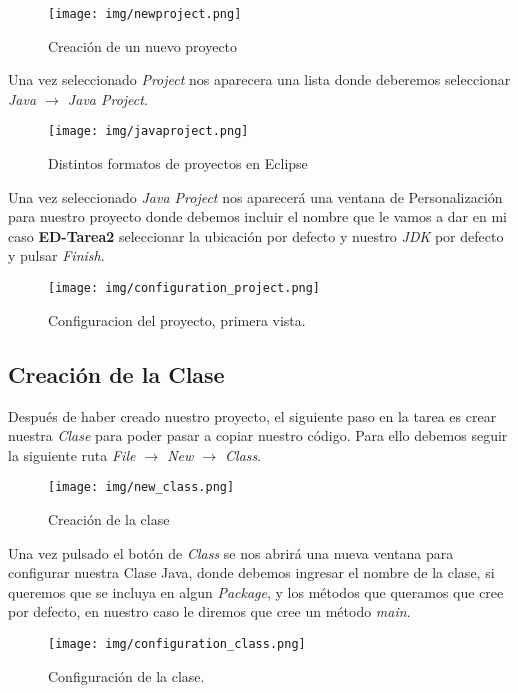 \documentclass{article}
\begin{document}
        \begin{figure}[h]
          \centering
          \texttt{[image: img/newproject.png]}
          \caption{Creación de un nuevo proyecto}
        \end{figure}
        
        Una vez seleccionado \textit{Project} nos aparecera una lista donde deberemos seleccionar \textit{Java $\rightarrow$ Java Project}.

  \newpage
        
        \begin{figure}[h]
          \centering
          \texttt{[image: img/javaproject.png]}
          \caption{Distintos formatos de proyectos en Eclipse}
        \end{figure}

        Una vez seleccionado \textit{Java Project} nos aparecerá una ventana de Personalización para nuestro proyecto donde debemos incluir el nombre que le vamos a dar 
        en mi caso \textbf{ED-Tarea2} seleccionar la ubicación por defecto y nuestro \textit{JDK} por defecto
        y pulsar \textit{Finish}.

        \begin{figure}[h]
          \centering
          \texttt{[image: img/configuration\_project.png]}
          \caption{Configuracion del proyecto, primera vista.}
        \end{figure}
        
  \newpage
    \subsection{Creación de la Clase}
          Después de haber creado nuestro proyecto, el siguiente paso en la tarea es crear nuestra \textit{Clase} para poder pasar a copiar nuestro código.
          Para ello debemos seguir la siguiente ruta \textit{File $\rightarrow$ New $\rightarrow$ Class}.
          \begin{figure}[h]
            \centering
            \texttt{[image: img/new\_class.png]}
            \caption{Creación de la clase}
          \end{figure}

          Una vez pulsado el botón de \textit{Class} se nos abrirá una nueva ventana para configurar nuestra Clase Java, donde debemos ingresar el nombre de la clase, si queremos que se 
          incluya en algun \textit{Package}, y los métodos que queramos que cree por defecto, en nuestro caso le diremos que cree un método \textit{main}.
          \begin{figure}[h]
            \centering
            \texttt{[image: img/configuration\_class.png]}
            \caption{Configuración de la clase.}
          \end{figure}
\end{document}
